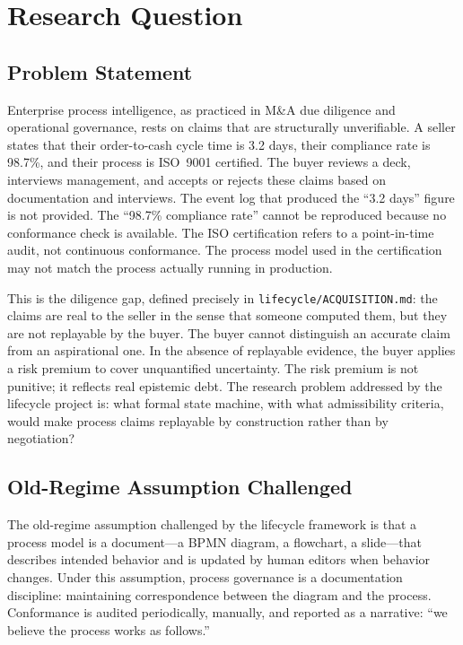 
\section{Research Question}
\label{sec:lifecycle-question}

\subsection{Problem Statement}
\label{sec:lifecycle-question-problem}

Enterprise process intelligence, as practiced in M\&A due diligence and operational
governance, rests on claims that are structurally unverifiable. A seller states that
their order-to-cash cycle time is 3.2 days, their compliance rate is 98.7\%, and their
process is ISO~9001 certified. The buyer reviews a deck, interviews management, and
accepts or rejects these claims based on documentation and interviews. The event log that
produced the ``3.2 days'' figure is not provided. The ``98.7\% compliance rate'' cannot
be reproduced because no conformance check is available. The ISO certification refers to
a point-in-time audit, not continuous conformance. The process model used in the
certification may not match the process actually running in production.

This is the diligence gap, defined precisely in \texttt{lifecycle/ACQUISITION.md}: the
claims are real to the seller in the sense that someone computed them, but they are not
replayable by the buyer. The buyer cannot distinguish an accurate claim from an
aspirational one. In the absence of replayable evidence, the buyer applies a risk premium
to cover unquantified uncertainty. The risk premium is not punitive; it reflects real
epistemic debt. The research problem addressed by the lifecycle project is: what formal
state machine, with what admissibility criteria, would make process claims replayable by
construction rather than by negotiation?

\subsection{Old-Regime Assumption Challenged}
\label{sec:lifecycle-question-old-regime}

The old-regime assumption challenged by the lifecycle framework is that a process model
is a document---a BPMN diagram, a flowchart, a slide---that describes intended behavior
and is updated by human editors when behavior changes. Under this assumption, process
governance is a documentation discipline: maintaining correspondence between the diagram
and the process. Conformance is audited periodically, manually, and reported as a
narrative: ``we believe the process works as follows.''

